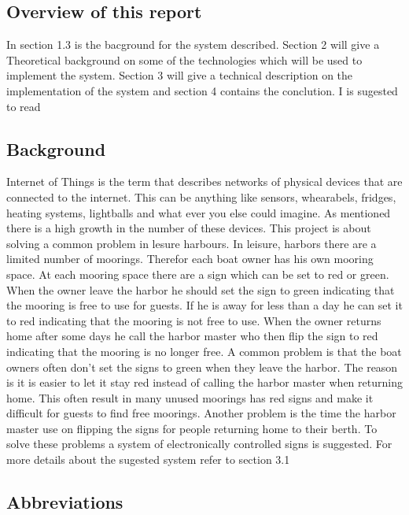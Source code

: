 \documentclass[a4paper,12pt,english]{article}
\begin{document}
\subsection{Overview of this report}
In section 1.3 is the bacground for the system described. Section 2 will give a
Theoretical background on some of the technologies which will be used
to implement the system. Section 3 will give a technical description on the
implementation of the system and section 4 contains the conclution. I is
sugested to read 
\subsection{Background}
Internet of Things is the term that describes networks of physical devices that
are connected to the internet. This can be anything like sensors, whearabels,
fridges, heating systems, lightballs and what ever you else could imagine. As
mentioned there is a high growth in the number of these devices. This project
is about solving a common problem in lesure harbours. 
In leisure, harbors there are a limited number of moorings. Therefor each boat
owner has his own mooring space. At each mooring space there are a sign which
can be set to red or green. When the owner leave the harbor he should set the
sign to green indicating that the mooring is free to use for guests. If he is
away for less than a day he can set it to red indicating that the mooring is
not free to use. When the owner returns home after some days he call the harbor
master who then flip the sign to red indicating that the mooring is no longer
free. A common problem is that the boat owners often don’t set the signs to
green when they leave the harbor. The reason is it is easier to let it stay red
instead of calling the harbor master when returning home. This often result in
many unused moorings has red signs and make it difficult for guests to find
free moorings. Another problem is the time the harbor master use on flipping
the signs for people returning home to their berth.
To solve these problems a system of electronically controlled signs is
suggested. For more details about the sugested system refer to section 3.1




\clearpage
\subsection{Abbreviations}


\renewcommand{\nomname}{}
\renewcommand{\pagedeclaration}[1]{}
\pagestyle{empty}
\printnomenclature[3cm]
\clearpage
\end{document}
